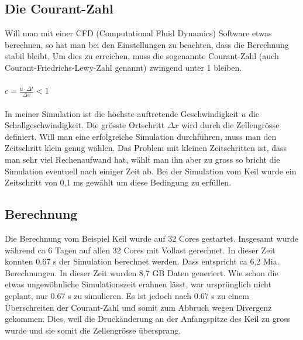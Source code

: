 \begin{refsection}
\subsection{Die Courant-Zahl}
Will man mit einer CFD (Computational Fluid Dynamics) Software etwas berechnen, so hat man bei den Einstellungen zu beachten, dass die Berechnung stabil bleibt. Um dies zu erreichen, muss die sogenannte Courant-Zahl (auch Courant-Friedrichs-Lewy-Zahl genannt) zwingend unter 1 bleiben. \\ \\
$c = \frac{u \cdot \Delta t}{\Delta x} < 1$ 
\\ \\
In meiner Simulation ist die höchste auftretende Geschwindigkeit $u$ die Schallgeschwindigkeit. Die grösste Ortschritt $\Delta x$ wird durch die Zellengrösse definiert. Will man eine erfolgreiche Simulation durchführen, muss man den Zeitschritt klein genug wählen. Das Problem mit kleinen Zeitschritten ist, dass man sehr viel Rechenaufwand hat, wählt man ihn aber zu gross so bricht die Simulation eventuell nach einiger Zeit ab. 
Bei der Simulation vom Keil wurde ein Zeitschritt von 0,1 ms gewählt um diese Bedingung zu erfüllen.

\subsection{Berechnung}
Die Berechnung vom Beispiel Keil wurde auf 32 Cores gestartet. Insgesamt wurde während ca 6 Tagen auf allen 32 Cores mit Vollast gerechnet. In dieser Zeit konnten 0.67 s der Simulation berechnet werden. Dass entspricht ca 6,2 Mia. Berechnungen. In dieser Zeit wurden 8,7 GB Daten generiert. Wie schon die etwas ungewöhnliche Simulationszeit erahnen lässt, war ursprünglich nicht geplant, nur 0.67 s zu simulieren. Es ist jedoch nach 0.67 s zu einem Überschreiten der Courant-Zahl und somit zum Abbruch wegen Divergenz gekommen. Dies, weil die Druckänderung an der Anfangspitze des Keil zu gross wurde und sie somit die Zellengrösse übersprang. 


\end{refsection}
